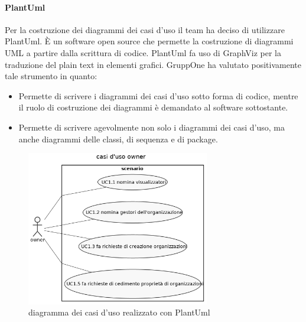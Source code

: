 \documentclass[../norme-di-progetto.tex]{subfiles}
\begin{document}
\paragraph{PlantUml}%
\label{par:plantuml}
Per la costruzione dei diagrammi dei casi d'uso il team ha deciso di utilizzare PlantUml. È un software open source che permette la costruzione di diagrammi UML a partire dalla scrittura di codice. PlantUml fa uso di GraphViz per la traduzione del plain text in elementi grafici. GruppOne ha valutato positivamente tale strumento in quanto:

\begin{itemize}
  \item Permette di scrivere i diagrammi dei casi d'uso sotto forma di codice, mentre il ruolo di costruzione dei diagrammi è demandato al software sottostante.
  \item Permette di scrivere agevolmente non solo i diagrammi dei casi d'uso, ma anche diagrammi delle classi, di sequenza e di package.
\end{itemize}

\begin{figure}[H]
  \includegraphics[width=8cm]{owner_use_cases.png}
  \centering
  \caption{diagramma dei casi d'uso realizzato con PlantUml}
\end{figure}
\end{document}
